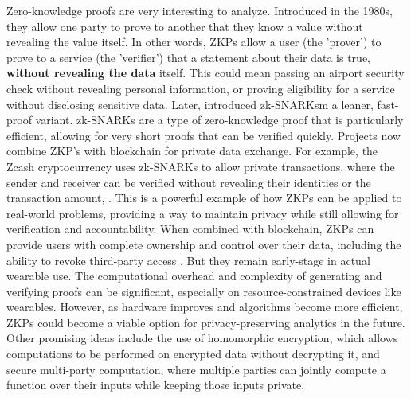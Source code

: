 	Zero-knowledge proofs are very interesting to analyze. Introduced in the 1980s, they allow one party to prove to another that they know a value without revealing the value itself. In other words, ZKPs allow a user (the 'prover') to prove to a service (the 'verifier') that a statement about their data is true, \textbf{without revealing the data} itself. This could mean passing an airport security check without revealing personal information, or proving eligibility for a service without disclosing sensitive data. Later, \cite{BenSasson2019} introduced zk-SNARKsm a leaner, fast-proof variant. zk-SNARKs are a type of zero-knowledge proof that is particularly efficient, allowing for very short proofs that can be verified quickly. Projects now combine ZKP's with blockchain for private data exchange. For example, the Zcash cryptocurrency uses zk-SNARKs to allow private transactions, where the sender and receiver can be verified without revealing their identities or the transaction amount, \cite{BenSasson2014}. This is a powerful example of how ZKPs can be applied to real-world problems, providing a way to maintain privacy while still allowing for verification and accountability. When combined with blockchain, ZKPs can provide users with complete ownership and control over their data, including the ability to revoke third-party access \cite{Zhou2023}. But they remain early-stage in actual wearable use. The computational overhead and complexity of generating and verifying proofs can be significant, especially on resource-constrained devices like wearables. However, as hardware improves and algorithms become more efficient, ZKPs could become a viable option for privacy-preserving analytics in the future.
	Other promising ideas include the use of homomorphic encryption, which allows computations to be performed on encrypted data without decrypting it, and secure multi-party computation, where multiple parties can jointly compute a function over their inputs while keeping those inputs private. 

